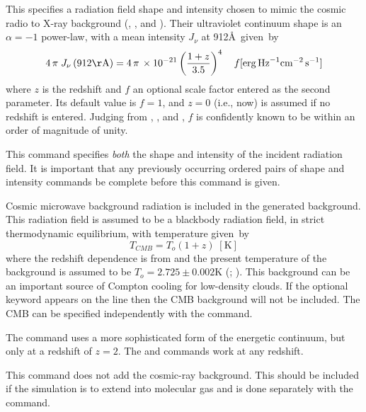 This specifies a radiation field shape and intensity
chosen to mimic the cosmic
radio to X-ray background (\citealp{Ostriker1983}, \citealp{Ikeuchi1986}, and \citealp{Vedel1994}).
Their ultraviolet
continuum shape is an $\alpha = -1$ power-law, with a mean intensity
$J_\nu$ at 912\AA\ given~by
\begin{equation}
4\,\pi \;J_\nu  \left( {912{\mathrm{{\AA}}}} \right) = 4\,\pi \, \times 10^{
- 21} \left( {\frac{{1 + z}}{{3.5}}} \right)^4 \quad f [\mathrm{erg\, Hz}^{-1}
\mathrm{cm}^{-2} \, \mathrm{s}^{-1}]
\end{equation}
where $z$ is the redshift and $f$ an optional scale factor entered as
the second parameter.
Its default value is $f = 1$, and $z = 0$ (i.e., now) is assumed
if no redshift is entered.
Judging from \citet{Bechtold1987}, \citet{Bajtlik1988}, and \citet{Vedel1994},
$f$ is confidently known to be within an order of magnitude of unity.

This command specifies \emph{both} the shape and intensity
of the incident radiation field.
It is important that any previously occurring ordered pairs of shape and
intensity commands be complete before this command is given.

Cosmic microwave background radiation is included in the generated
background.
This radiation field is assumed to be a blackbody radiation
field, in strict thermodynamic equilibrium, with temperature given~by
\begin{equation}
T_{CMB}  = T_o \left( {1 + z} \right)\; [\mathrm{K}]%
\end{equation}
where the redshift dependence is from \citet{Peebles1971} and the present
temperature of the background is assumed to be $T_o = 2.725 \pm 0.002$K
(\citealp{Mather1999}; \citealp{Wilkinson1987}).
This background can be an important source
of Compton cooling for low-density clouds.
If the optional keyword
appears on the line then the CMB background will not be included.
The CMB can be specified independently with
the  command.

The  command uses a more sophisticated
form of the energetic continuum, but only at a redshift of $z = 2$.
The  and 
commands work at any redshift.

This command does not add the cosmic-ray background.
This should be
included if the simulation is to extend into molecular gas and is done
separately with the  command.

